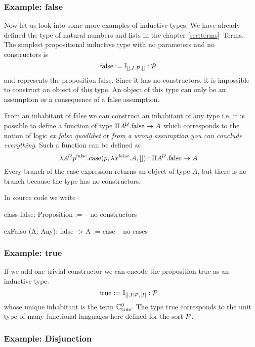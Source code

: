 \subsubsection{Example: false}

Now let us look into some more examples of inductive types. We have already
defined the type of natural numbers and lists in the chapter
\ref{sec:terms}~Terms.
%
The simplest propositional inductive type with no parameters and no
constructors is
$$
\text{false} := \mathbb{I}_{[], I:{\cal{P}}, []} : {\cal{P}}
$$
and represents the proposition $\text{false}$. Since it has no constructors,
it is impossible to construct an object of this type. An object of this type
can only be an assumption or a consequence of a false assumption.


From an inhabitant of false we can construct an inhabitant of any type i.e. it
is possible to define a function of type $\Pi A^{\cal{U}}. \text{false} \to A$
which corresponds to the notion of logic \emph{ex falso quodlibet} or
\emph{from a wrong assumption you can conclude everything}.
%
Such a function can be defined as
$$
\lambda A^{\cal{U}} p^\text{false}. \text{case}(p, \lambda x^\text{false}. A, [])
: \Pi A^{\cal{U}}. \text{false} \to A
$$
%
Every branch of the case expression returns an object of type $A$, but there
is no branch because the type has no constructors.

In source code we write
\begin{alba}
    class false: Proposition := -- no constructors

    exFalso (A: Any): false -> A
    := case -- no cases
\end{alba}


\subsubsection{Example: true}

If we add one trivial constructor we can encode the proposition $\text{true}$
as an inductive type.
%
$$
\text{true} := \mathbb{I}_{[], I:{\cal{P}}, [I]} : {\cal{P}}
$$
whose unique inhabitant is the term $\mathbb{C}^0_{\text{true}}$. The type
$\text{true}$ corresponds to the unit type of many functional languages here
defined for the sort ${\cal{P}}$.



\subsubsection{Example: Disjunction}

